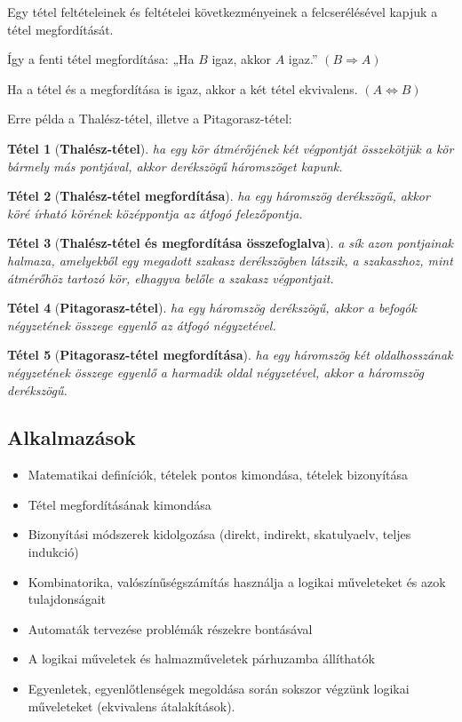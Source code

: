 \documentclass[12pt,a4paper]{article}
\newtheorem{theorem}{Tétel} [section]
\begin{document}
Egy tétel feltételeinek és feltételei következményeinek a felcserélésével kapjuk a tétel megfordítását.

Így a fenti tétel megfordítása: „Ha $B$ igaz, akkor $A$ igaz.” $(B \Rightarrow A)$

Ha a tétel és a megfordítása is igaz, akkor a két tétel ekvivalens. $(A \Leftrightarrow B)$

Erre példa a Thalész-tétel, illetve a Pitagorasz-tétel:

\begin{theorem}[\textbf{Thalész-tétel}]
ha egy kör átmérőjének két végpontját összekötjük a kör bármely más pontjával, akkor derékszögű háromszöget kapunk.
\end{theorem}

\begin{theorem}[\textbf{Thalész-tétel megfordítása}]
ha egy háromszög derékszögű, akkor köré írható körének középpontja az átfogó felezőpontja.
\end{theorem}

\begin{theorem}[\textbf{Thalész-tétel és megfordítása összefoglalva}]
a sík azon pontjainak halmaza, amelyekből egy megadott szakasz derékszögben látszik, a szakaszhoz, mint átmérőhöz tartozó kör, elhagyva belőle a szakasz végpontjait.
\end{theorem}

\begin{theorem}[\textbf{Pitagorasz-tétel}]
ha egy háromszög derékszögű, akkor a befogók négyzetének összege egyenlő az átfogó négyzetével.
\end{theorem}

\begin{theorem}[\textbf{Pitagorasz-tétel megfordítása}]
ha egy háromszög két oldalhosszának négyzetének összege egyenlő a harmadik oldal négyzetével, akkor a háromszög derékszögű.
\end{theorem}

\subsection{Alkalmazások}
\begin{itemize}
\item Matematikai definíciók, tételek pontos kimondása, tételek bizonyítása
\item Tétel megfordításának kimondása
\item Bizonyítási módszerek kidolgozása (direkt, indirekt, skatulyaelv, teljes indukció)
\item Kombinatorika, valószínűségszámítás használja a logikai műveleteket és azok tulajdonságait
\item Automaták tervezése problémák részekre bontásával
\item A logikai műveletek és halmazműveletek párhuzamba állíthatók
\item Egyenletek, egyenlőtlenségek megoldása során sokszor végzünk logikai műveleteket (ekvivalens átalakítások).
\end{itemize}
\end{document}
